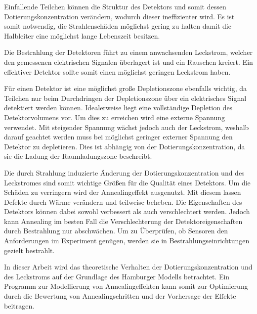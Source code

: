 Einfallende Teilchen können die
Struktur des Detektors und somit dessen Dotierungskonzentration verändern, wodurch dieser ineffizienter wird.
Es ist somit notwendig, die Strahlenschäden möglichst gering zu halten damit
die Halbleiter eine möglichst lange Lebenszeit besitzen.

Die Bestrahlung der Detektoren führt zu einem anwachsenden Leckstrom, welcher den
gemessenen elektrischen Signalen überlagert ist und ein Rauschen kreiert. Ein
effektiver Detektor sollte somit einen möglichst geringen Leckstrom haben.

Für einen Detektor ist eine möglichst große Depletionszone ebenfalls wichtig,
da Teilchen nur beim Durchdringen der Depletionszone über ein elektrisches Signal detektiert
werden können.
Idealerweise
liegt eine vollständige Depletion des Detektorvolumens vor. Um dies zu erreichen wird
eine externe Spannung verwendet. Mit steigender Spannung wächst jedoch auch der Leckstrom, weshalb
darauf geachtet werden muss bei möglichst geringer externer Spannung den Detektor zu depletieren.
Dies ist abhängig von der Dotierungskonzentration, da sie die Ladung der
Raumladungszone beschreibt.

Die durch Strahlung induzierte Änderung der Dotierungskonzentration und des Leckstromes sind
somit wichtige Größen für die Qualität eines Detektors.
Um die Schäden zu verringern wird der Annealingeffekt ausgenutzt. Mit diesem lassen
Defekte durch Wärme verändern und teilweise beheben. Die Eigenschaften des Detektors können
dabei sowohl verbessert als auch verschlechtert werden.
Jedoch kann Annealing im besten Fall die Verschlechterung der Detektoreigenschaften durch Bestrahlung nur
abschwächen.
Um zu Überprüfen, ob Sensoren den Anforderungen im Experiment genügen, werden sie in
Bestrahlungseinrichtungen gezielt bestrahlt.

In dieser Arbeit wird das
theoretische Verhalten der Dotierungskonzentration und des Leckstroms auf der Grundlage des Hamburger Modells betrachtet.
Ein Programm zur Modellierung von Annealingeffekten kann somit zur
Optimierung durch die Bewertung von Annealingschritten und der Vorhersage der Effekte beitragen.


